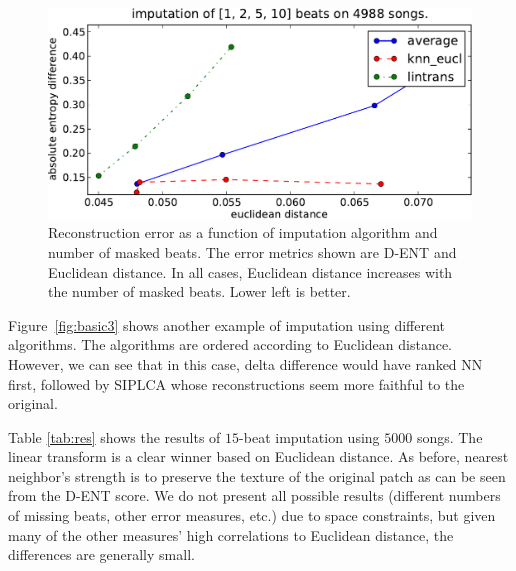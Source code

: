 \documentclass{article}
\begin{document}
\begin{figure}[t]
\begin{center}
\includegraphics[width=.8\columnwidth]{recon_score_in_2d_5k}
\end{center}
\caption{Reconstruction error as a function of imputation algorithm
  and number of masked beats.  The error metrics shown are D-ENT
  and Euclidean distance. In all cases, Euclidean distance increases
   with the number of masked beats. Lower left is better.
\label{fig:2dscore}}
\end{figure}

Figure~\ref{fig:basic3} shows another example of imputation using
different algorithms.  The algorithms are ordered according to
Euclidean distance.  However, we can see that in this case, delta
difference would have ranked NN first, followed by SIPLCA whose
reconstructions seem more faithful to the original.

Table \ref{tab:res} shows the results of $15$-beat imputation using
$5000$ songs. The linear transform is a clear winner based on
Euclidean distance. As before, nearest neighbor's strength is to
preserve the texture of the original patch as can be seen from the
D-ENT score.  We do not present all possible results (different
numbers of missing beats, other error measures, etc.) due to space
constraints, but given many of the other measures' high correlations
to Euclidean distance, the differences are generally small.

\end{document}
